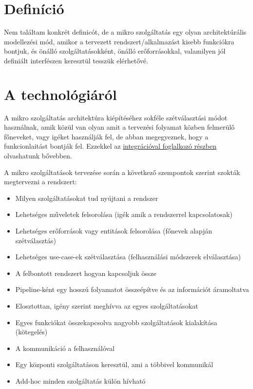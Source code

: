 \documentclass[11pt,magyar,a4paper,oneside,]{report}
\begin{document}
\section{Definíció}\label{definuxedciuxf3}

Nem találtam konkrét definicót, de a mikro szolgáltatás egy olyan
architektúrális modellezési mód, amikor a tervezett
rendszert/alkalmazást kisebb funkciókra bontjuk, és önálló
szolgáltatásokként, önálló erőforrásokkal, valamilyen jól definiált
interfészen keresztül tesszük elérhetővé.

\section{A technológiáról}\label{a-technoluxf3giuxe1ruxf3l}

A mikro szolgáltatás architektúra kiépítéséhez sokféle szétválasztási
módot használnak, amik közül van olyan amit a tervezési folyamat közben
felmerülő főneveket, vagy igéket használják fel, de abban megegyeznek,
hogy a funkcionlaitást bontják fel. Ezzekkel az
\href{Integrációs-minták}{integrációval foglalkozó részben} olvashatunk
bővebben.

A mikro szolgáltatások tervezése során a következő szempontok szerint
szokták megtervezni a rendszert:

\begin{itemize}
\itemsep1pt\parskip0pt
\item
  Milyen szolgáltatásokat tud nyújtani a rendszer
\item
  Lehetséges műveletek felsorolása (igék amik a rendszerrel
  kapcsolatosak)
\item
  Lehetséges erőforrások vagy entitások felsorolása (főnevek alapján
  szétválasztás)
\item
  Lehetséges use-case-ek szétválasztása (felhasználási módszerek
  elválasztása)
\item
  A felbontott rendszert hogyan kapcsoljuk össze
\item
  Pipeline-ként egy hosszú folyamatot összeépítve és az információt
  áramoltatva
\item
  Elosztottan, igény szerint meghívva az egyes szolgáltatásokat
\item
  Egyes funkciókat összekapcsolva nagyobb szolgáltatások kialakítása
  (kötegelés)
\item
  A kommunikáció a felhasználóval
\item
  Egy központi szolgáltatáson keresztül, ami a többivel kommunikál
\item
  Add-hoc minden szolgáltatás külön hívható
\end{itemize}
\end{document}
